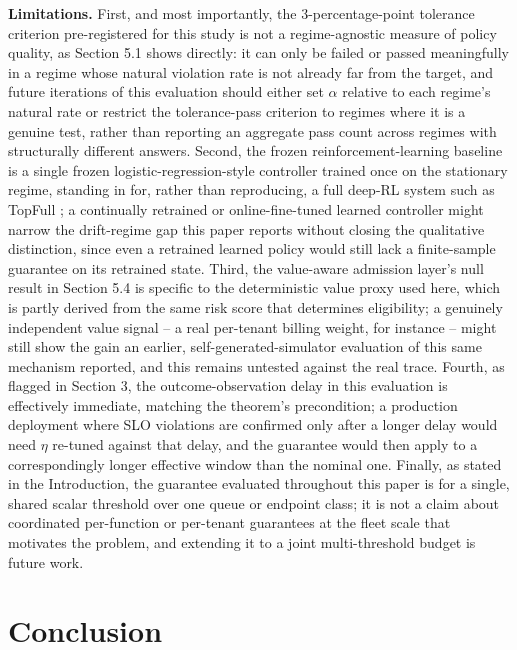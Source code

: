 \documentclass[11pt,letterpaper]{article}
\begin{document}
\textbf{Limitations.} First, and most importantly, the 3-percentage-point tolerance criterion pre-registered for this study is not a regime-agnostic measure of policy quality, as Section 5.1 shows directly: it can only be failed or passed meaningfully in a regime whose natural violation rate is not already far from the target, and future iterations of this evaluation should either set $\alpha$ relative to each regime's natural rate or restrict the tolerance-pass criterion to regimes where it is a genuine test, rather than reporting an aggregate pass count across regimes with structurally different answers. Second, the frozen reinforcement-learning baseline is a single frozen logistic-regression-style controller trained once on the stationary regime, standing in for, rather than reproducing, a full deep-RL system such as TopFull \citep{Park2024}; a continually retrained or online-fine-tuned learned controller might narrow the drift-regime gap this paper reports without closing the qualitative distinction, since even a retrained learned policy would still lack a finite-sample guarantee on its retrained state. Third, the value-aware admission layer's null result in Section 5.4 is specific to the deterministic value proxy used here, which is partly derived from the same risk score that determines eligibility; a genuinely independent value signal -- a real per-tenant billing weight, for instance -- might still show the gain an earlier, self-generated-simulator evaluation of this same mechanism reported, and this remains untested against the real trace. Fourth, as flagged in Section 3, the outcome-observation delay in this evaluation is effectively immediate, matching the theorem's precondition; a production deployment where SLO violations are confirmed only after a longer delay would need $\eta$ re-tuned against that delay, and the guarantee would then apply to a correspondingly longer effective window than the nominal one. Finally, as stated in the Introduction, the guarantee evaluated throughout this paper is for a single, shared scalar threshold over one queue or endpoint class; it is not a claim about coordinated per-function or per-tenant guarantees at the fleet scale that motivates the problem, and extending it to a joint multi-threshold budget is future work.

\section{Conclusion}
\end{document}
